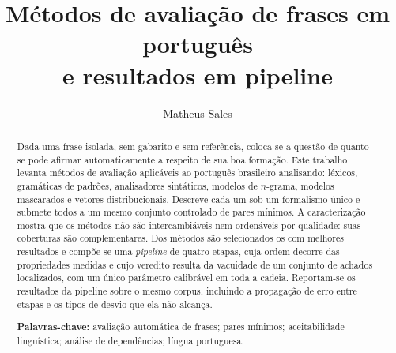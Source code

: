 \documentclass[11pt,a4paper]{article}
\title{\textbf{Métodos de avaliação de frases em português\\
       e resultados em pipeline}}
\author{Matheus Sales}
\date{}   %
\theoremstyle{plain}
\theoremstyle{definition}
\begin{document}
\maketitle

\begin{abstract}
\noindent
Dada uma frase isolada, sem gabarito e sem referência, coloca-se a questão de quanto se
pode afirmar automaticamente a respeito de sua boa formação. Este trabalho levanta
métodos de avaliação aplicáveis ao português brasileiro analisando: léxicos, gramáticas de
padrões, analisadores sintáticos, modelos de $n$-grama, modelos mascarados e vetores
distribucionais. Descreve cada um sob um formalismo único e submete todos a um mesmo
conjunto controlado de pares mínimos. A caracterização mostra que os métodos não são
intercambiáveis nem ordenáveis por qualidade: suas coberturas são complementares. 
Dos métodos são selecionados os com melhores resultados e compõe-se uma \emph{pipeline} 
de quatro etapas, cuja ordem decorre das propriedades medidas e 
cujo veredito resulta da vacuidade de um conjunto de achados
localizados, com um único parâmetro calibrável em toda a cadeia. Reportam-se os resultados
da pipeline sobre o mesmo corpus, incluindo a propagação de erro entre etapas e os tipos
de desvio que ela não alcança.

\vspace{6pt}
\noindent\textbf{Palavras-chave:} avaliação automática de frases; pares mínimos;
aceitabilidade linguística; análise de dependências; língua portuguesa.
\end{abstract}

\vspace{12pt}


% 
% 



% 



\printbibliography[title={Referências}]

% 
% 
% 
\end{document}
